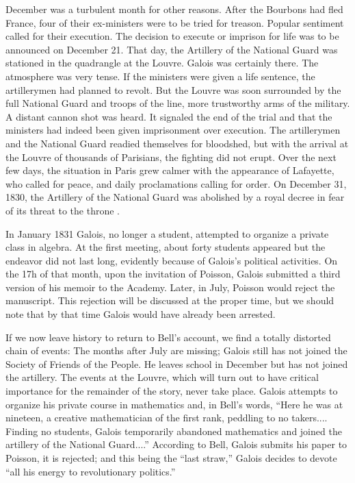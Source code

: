 \documentclass[12pt]{article}
\begin{document}
December was a turbulent month for other reasons. After the Bourbons had fled France, four of their ex-ministers were to be tried for treason. Popular sentiment called for their execution. The decision to execute or imprison for life was to be announced on December 21. That day, the Artillery of the National Guard was stationed in the quadrangle at the Louvre. Galois was certainly there. The atmosphere was very tense. If the ministers were given a life sentence, the artillerymen had planned to revolt. But the Louvre was soon surrounded by the full National Guard and troops of the line, more trustworthy arms of the military. A distant cannon shot was heard. It signaled the end of the trial and that the ministers had indeed been given imprisonment over execution. The artillerymen and the National Guard readied themselves for bloodshed, but with the arrival at the Louvre of thousands of Parisians, the fighting did not erupt. Over the next few days, the situation in Paris grew calmer with the appearance of Lafayette, who called for peace, and daily proclamations calling for order. On December 31, 1830, the Artillery of the National Guard was abolished by a royal decree in fear of its threat to the throne \cite{42}.

In January 1831 Galois, no longer a student, attempted to organize a private class in algebra. At the first meeting, about forty students appeared \cite{43} but the endeavor did not last long, evidently because of Galois's political activities. On the 17h of that month, upon the invitation of Poisson, Galois submitted a third version of his memoir to the Academy. Later, in July, Poisson would reject the manuscript. This rejection will be discussed at the proper time, but we should note that by that time Galois would have already been arrested.

If we now leave history to return to Bell's account, we find a totally distorted chain of events: The months after July are missing; Galois still has not joined the Society of Friends of the People. He leaves school in December but has not joined the artillery. The events at the Louvre, which will turn out to have critical importance for the remainder of the story, never take place. Galois attempts to organize his private course in mathematics and, in Bell's words, ``Here he was at nineteen, a creative mathematician of the first rank, peddling to no takers.... Finding no students, Galois temporarily abandoned mathematics and joined the artillery of the National Guard....'' \cite{44} According to Bell, Galois submits his paper to Poisson, it is rejected; and this being the ``last straw,'' Galois decides to devote ``all his energy to revolutionary politics.''
\end{document}
